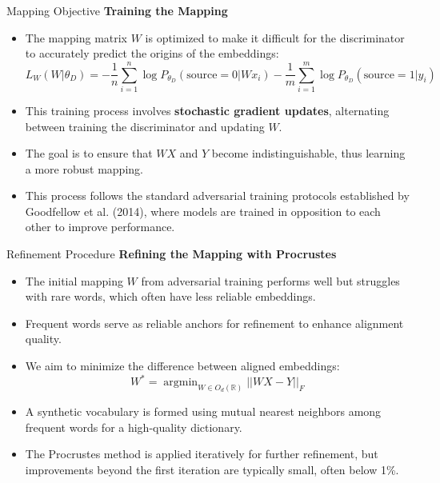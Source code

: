 \documentclass[]{beamer}
\DeclareMathOperator*{\argmin}{argmin}
\begin{document}
\begin{frame}{Mapping Objective}
    \small
    \textbf{Training the Mapping}
    \begin{itemize}
        \item The mapping matrix $W$ is optimized to make it difficult for the discriminator to accurately predict the origins of the embeddings:
        \scriptsize 
        \begin{equation}
            L_W(W | \theta_D) = - \frac{1}{n} \sum_{i=1}^n \log P_{\theta_D}(\text{source} = 0 | W x_i) - \frac{1}{m} \sum_{i=1}^m \log P_{\theta_D}(\text{source} = 1 | y_i)
        \end{equation}
	\small
        \item This training process involves \textbf{stochastic gradient updates}, alternating between training the discriminator and updating $W$. 
        \item The goal is to ensure that $WX$ and $Y$ become indistinguishable, thus learning a more robust mapping.
        \item This process follows the standard adversarial training protocols established by Goodfellow et al. (2014), where models are trained in opposition to each other to improve performance.
    \end{itemize}
\end{frame}

\begin{frame}{Refinement Procedure}
    \small
    \textbf{Refining the Mapping with Procrustes}
    \begin{itemize}
        \item The initial mapping $W$ from adversarial training performs well but struggles with rare words, which often have less reliable embeddings.
        \item Frequent words serve as reliable anchors for refinement to enhance alignment quality.
        \item We aim to minimize the difference between aligned embeddings:
        \begin{equation}
            W^* = \argmin_{W \in O_d(\mathbb{R})} || W X - Y ||_F
        \end{equation}
        \item A synthetic vocabulary is formed using mutual nearest neighbors among frequent words for a high-quality dictionary.
        \item The Procrustes method is applied iteratively for further refinement, but improvements beyond the first iteration are typically small, often below 1\%.
    \end{itemize}
\end{frame}
\end{document}
